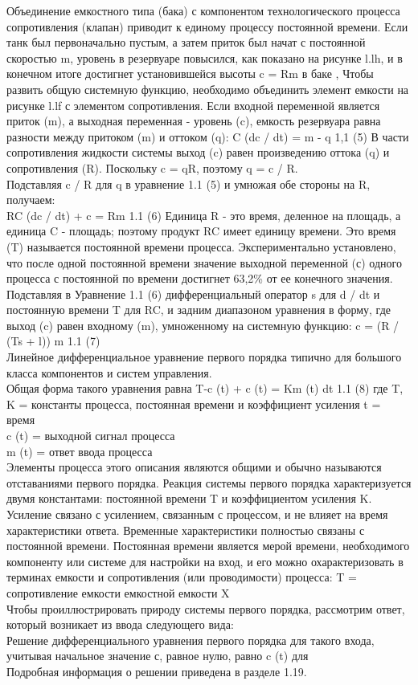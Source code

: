 \documentclass[aps,
12pt,
final,
oneside,
onecolumn,
musixtex, 
superscriptaddress,
centertags]{article}
\begin{document}
Объединение емкостного типа (бака) с компонентом технологического процесса сопротивления (клапан) приводит к единому процессу постоянной времени. Если танк был первоначально пустым, а затем приток был начат с постоянной скоростью m, уровень в резервуаре повысился, как показано на рисунке l.lh, и в конечном итоге достигнет установившейся высоты c = Rm в баке ,
Чтобы развить общую системную функцию, необходимо объединить элемент емкости на рисунке l.lf с элементом сопротивления. Если входной переменной является приток (m), а выходная переменная - уровень (c), емкость резервуара равна разности между притоком (m) и оттоком (q):
C (dc / dt) = m - q 1,1 (5) В части сопротивления жидкости системы выход (c) равен произведению оттока (q) и сопротивления (R). Поскольку c = qR, поэтому q = c / R. \\
Подставляя c / R для q в уравнение 1.1 (5) и умножая обе стороны на R, получаем: \\
RC (dc / dt) + c = Rm 1.1 (6) Единица R - это время, деленное на площадь, а единица C - площадь; поэтому продукт RC имеет единицу времени. Это время (T) называется постоянной времени процесса. Экспериментально установлено, что после одной постоянной времени значение выходной переменной (с) одного процесса с постоянной по времени достигнет 63,2\% от ее конечного значения. Подставляя в Уравнение 1.1 (6) дифференциальный оператор s для d / dt и постоянную времени T для RC, и задним диапазоном уравнения в форму, где выход (c) равен входному (m), умноженному на системную функцию:
c = (R / (Ts + l)) m 1.1 (7) \\
Линейное дифференциальное уравнение первого порядка типично для большого класса компонентов и систем управления. \\
Общая форма такого уравнения равна T-c (t) + c (t) = Km (t) dt 1.1 (8) где T, K = константы процесса, постоянная времени и коэффициент усиления t = время \\
c (t) = выходной сигнал процесса \\
m (t) = ответ ввода процесса \\

Элементы процесса этого описания являются общими и обычно называются отставаниями первого порядка. Реакция системы первого порядка характеризуется двумя константами: постоянной времени T и коэффициентом усиления K. Усиление связано с усилением, связанным с процессом, и не влияет на время
характеристики ответа. Временные характеристики полностью связаны с постоянной времени. Постоянная времени является мерой времени, необходимого компоненту или системе для настройки на вход, и его можно охарактеризовать в терминах емкости и сопротивления (или проводимости) процесса:
T = сопротивление емкости емкостной емкости X
\\
Чтобы проиллюстрировать природу системы первого порядка, рассмотрим ответ, который возникает из ввода следующего вида:
\\
Решение дифференциального уравнения первого порядка для такого входа, учитывая начальное значение с, равное нулю, равно c (t) для
\\
Подробная информация о решении приведена в разделе 1.19.
\end{document}
